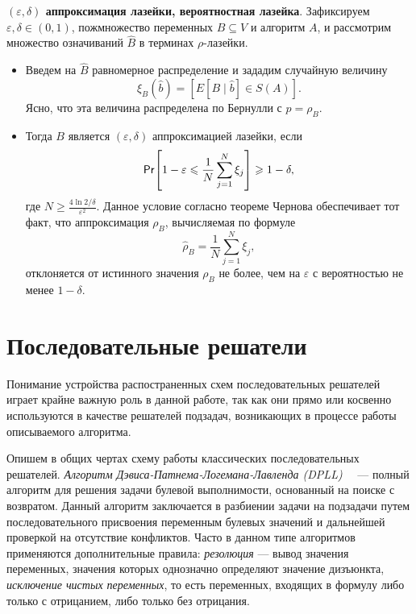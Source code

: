 \begin{definition}\label{overview:prob-backdoor}
    \textbf{$(\varepsilon, \delta)$ аппроксимация лазейки, вероятностная лазейка}. Зафиксируем
    $\varepsilon, \delta \in (0, 1)$, пожмножество переменных $B \subseteq V$ и алгоритм $A$, 
    и рассмотрим множество означиваний $\hat{B}$ в терминах $\rho$-лазейки.
    \begin{itemize}
        \item Введем на $\hat{B}$ равномерное распределение и зададим случайную величину
            \[
                \xi_B(\hat{b}) = \left[E[B \mid \hat{b}] \in S(A)\right].
            \]
            Ясно, что эта величина распределена по Бернулли с $p = \rho_B$.
        \item Тогда $B$ является $(\varepsilon, \delta)$ аппроксимацией лазейки, если
            \[
                \mathsf{Pr}{\left[1 - \varepsilon \leqslant \frac{1}{N}\sum_{j=1}^{N}{\xi_j}\right]}
                \geqslant 1 - \delta,
            \]
            где $N \geqslant \frac{4 \ln{2/\delta}}{\varepsilon^2}$. Данное условие согласно
            теореме Чернова  обеспечивает тот факт, что аппроксимация $\rho_B$,
            вычисляемая по формуле 
            \begin{equation}
                \hat{\rho}_B = \frac{1}{N} \sum_{j=1}^{N}{\xi_j}\label{overview:rho-hat},
            \end{equation}
            отклоняется от истинного значения $\rho_B$ не более, чем на $\varepsilon$ с вероятностью 
            не менее $1 - \delta$.
    \end{itemize}
\end{definition}

\startrelatedwork

\section{Последовательные решатели}\label{overview:sequential}

Понимание устройства распостраненных схем последовательных решателей играет крайне важную роль в
данной работе, так как они прямо или косвенно используются в качестве решателей подзадач,
возникающих в процессе работы описываемого алгоритма.

Опишем в общих чертах схему работы классических последовательных решателей. 
\textit{Алгоритм Дэвиса-Патнема-Логемана-Лавленда (DPLL)}~\cite{bib:dpll-1}~\cite{bib:dpll-2}
--- полный алгоритм для решения задачи булевой выполнимости, основанный на поиске с возвратом. 
Данный алгоритм заключается в разбиении задачи на подзадачи путем последовательного присвоения 
переменным булевых значений и дальнейшей проверкой на отсутствие конфликтов. Часто в данном
типе алгоритмов применяются дополнительные правила: \textit{резолюция} --- вывод значения переменных,
значения которых однозначно определяют значение дизъюнкта, \textit{исключение чистых переменных},
то есть переменных, входящих в формулу либо только с отрицанием, либо только без отрицания.

